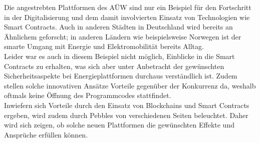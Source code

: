 Die angestrebten Plattformen des AÜW sind nur ein Beispiel für den Fortschritt in der Digitalisierung und dem damit involvierten Einsatz von Technologien wie Smart Contracts. Auch in anderen Städten in Deutschland wird bereits an Ähnlichem geforscht; in anderen Ländern wie beispielsweise Norwegen ist der smarte Umgang mit Energie und Elektromobilität bereits Alltag. \\
Leider war es auch in diesem Beispiel nicht möglich, Einblicke in die Smart Contracts zu erhalten, was sich aber unter Anbetracht der gewünschten Sicherheitsaspekte bei Energieplattformen durchaus verständlich ist. Zudem stellen solche innovativen Ansätze Vorteile gegenüber der Konkurrenz da, weshalb oftmals keine Öffnung des Programmcodes stattfindet. \\
Inwiefern sich Vorteile durch den Einsatz von Blockchains und Smart Contracts ergeben, wird zudem durch Pebbles von verschiedenen Seiten beleuchtet. Daher wird sich zeigen, ob solche neuen Plattformen die gewünschten Effekte und Ansprüche erfüllen können.